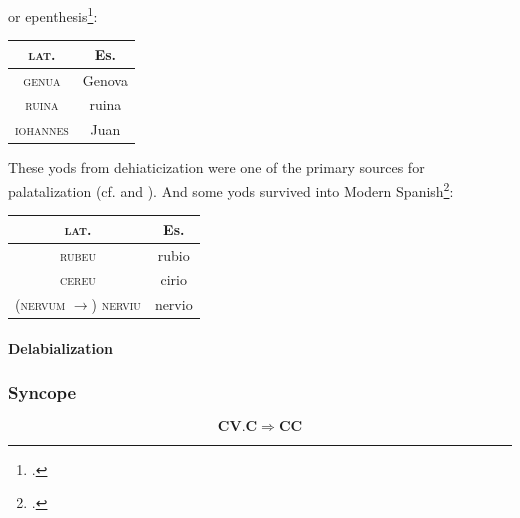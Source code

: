 \documentclass{report}[12pt]
\begin{document}
or epenthesis\footcite[p.~57-58]{romance_his}:
\begin{center}
  \begin{tabular}{c c}
    \textsc{lat.} & Es. \\
    \hline
    \textsc{genua} & Genova \\
    \textsc{ruina} & ruina \\
    \textsc{iohannes} & Juan \\
  \end{tabular}
\end{center}
These yods from dehiaticization were one of the primary sources for palatalization (cf.  and ). And some yods survived into Modern Spanish\footcite[p.~134]{lloyd_spanish}:
\begin{center}
  \begin{tabular}{c c}
    \textsc{lat.} & Es. \\
    \hline
    \textsc{rubeu} & rubio \\
    \textsc{cereu} & cirio \\
    (\textsc{nervum} $\rightarrow$) \textsc{nerviu} & nervio \\
  \end{tabular}
\end{center}

\paragraph{Delabialization}

\subsubsection{Syncope}

\begin{tcolorbox}
   \[ \textbf{C}\textbf{V}.\textbf{C} \Rightarrow \textbf{C}\textbf{C} \]
\end{tcolorbox}
\end{document}
